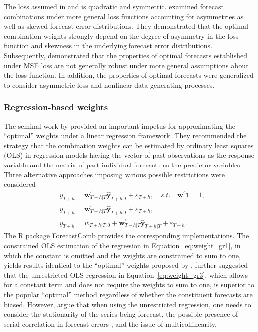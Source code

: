 \documentclass[a4paper,11pt]{article}
\newcommand{\pkg}[1]{{\normalfont\fontseries{b}\selectfont #1}}
\let\proglang=\textsf
\begin{document}
The loss assumed in \citet{Bates1969-yj} and \citet{Newbold1974-lp} is quadratic and symmetric. \citet{Elliott2004-dz} examined forecast combinations under more general loss functions accounting for asymmetries as well as skewed forecast error distributions. They demonstrated that the optimal combination weights strongly depend on the degree of asymmetry in the loss function and skewness in the underlying forecast error distributions. Subsequently, \citet{Patton2007-zo} demonstrated that the properties of optimal forecasts established under MSE loss are not generally robust under more general assumptions about the loss function. In addition, the properties of optimal forecasts were generalized to consider asymmetric loss and nonlinear data generating processes.

\subsubsection*{Regression-based weights}

The seminal work by \citet{Granger1984-jc} provided an important impetus for approximating the ``optimal'' weights under a linear regression framework. They recommended the strategy that the combination weights can be estimated by ordinary least squares (OLS) in regression models having the vector of past observations as the response variable and the matrix of past individual forecasts as the predictor variables. Three alternative approaches imposing various possible restrictions were considered
\begin{align}
   & y_{T+h}=\bm{w}_{T+h|T}^{\prime} \hat{\bm{y}}_{T+h|T}+\varepsilon_{T+h}, \quad s.t. \quad \bm{w}^{\prime}\bm{1}=1, \label{eq:weight_gr1} \\
   & y_{T+h}=\bm{w}^{\prime}_{T+h|T} \hat{\bm{y}}_{T+h|T}+\varepsilon_{T+h}, \\
   & y_{T+h}=w_{T+h|T, 0}+\bm{w}_{T+h|T}^{\prime} \hat{\bm{y}}_{T+h|T}+\varepsilon_{T+h}. \label{eq:weight_gr3}
\end{align}
The \proglang{R} package \pkg{ForecastComb} \citep{rForecastComb} provides the corresponding implementations. The constrained OLS estimation of the regression in Equation~\eqref{eq:weight_gr1}, in which the constant is omitted and the weights are constrained to sum to one, yields results identical to the ``optimal'' weights proposed by \citet{Bates1969-yj}. \citet{Granger1984-jc} further suggested that the unrestricted OLS regression in Equation~\eqref{eq:weight_gr3}, which allows for a constant term and does not require the weights to sum to one, is superior to the popular ``optimal'' method regardless of whether the constituent forecasts are biased. However, \citet{De_Menezes2000-vd} argue that when using the unrestricted regression, one needs to consider the stationarity of the series being forecast, the possible presence of serial correlation in forecast errors \citep[see also][]{Diebold1988-sx,Edward_Coulson1993-db}, and the issue of multicollinearity.
\end{document}
